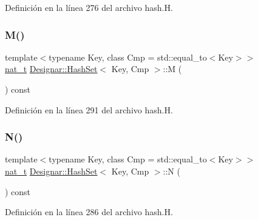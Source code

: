 Definición en la línea 276 del archivo hash.\+H.

\mbox{\label{class_designar_1_1_hash_set_ab77d2d3a6ce83395b35b9cdbbcf18c2b}} 
\subsubsection{\texorpdfstring{M()}{M()}}
{\footnotesize\ttfamily template$<$typename Key, class Cmp = std\+::equal\+\_\+to$<$\+Key$>$$>$ \\
\hyperlink{namespace_designar_aa72662848b9f4815e7bf31a7cf3e33d1}{nat\+\_\+t} \hyperlink{class_designar_1_1_hash_set}{Designar\+::\+Hash\+Set}$<$ Key, Cmp $>$\+::M (\begin{DoxyParamCaption}{ }\end{DoxyParamCaption}) const\hspace{0.3cm}{\ttfamily [inline]}}



Definición en la línea 291 del archivo hash.\+H.

\mbox{\label{class_designar_1_1_hash_set_a37cc23bf083078151f6f55b479c213ae}} 
\subsubsection{\texorpdfstring{N()}{N()}}
{\footnotesize\ttfamily template$<$typename Key, class Cmp = std\+::equal\+\_\+to$<$\+Key$>$$>$ \\
\hyperlink{namespace_designar_aa72662848b9f4815e7bf31a7cf3e33d1}{nat\+\_\+t} \hyperlink{class_designar_1_1_hash_set}{Designar\+::\+Hash\+Set}$<$ Key, Cmp $>$\+::N (\begin{DoxyParamCaption}{ }\end{DoxyParamCaption}) const\hspace{0.3cm}{\ttfamily [inline]}}



Definición en la línea 286 del archivo hash.\+H.

\mbox{\label{class_designar_1_1_hash_set_aed1240e62fdb7745bc9d7a123aa6da6a}} 

